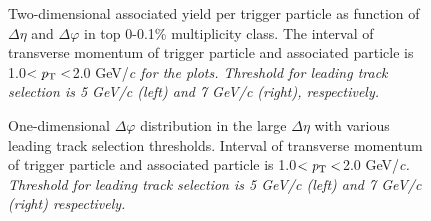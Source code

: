 \documentclass[ALICE,manyauthors]{cernphprep}
\begin{document}
\begin{figure}
	\centering
	\caption{ Two-dimensional associated yield per trigger particle as function of $\Delta\eta$ and $\Delta\varphi$ in top 0-0.1\% multiplicity class. The interval of transverse momentum of trigger particle and associated particle is 1.0$<\it{p}_{\rm{T}}<$2.0 GeV/\it{c}\rm{} for the plots. Threshold for leading track selection is 5 GeV/\it{c}\rm{} (left) and 7 GeV/\it{c}\rm{} (right), respectively. }
\end{figure}


\begin{figure}
	\centering
	\caption{ One-dimensional $\Delta\varphi$ distribution in the large $\Delta\eta$ with various leading track selection thresholds. Interval of transverse momentum of trigger particle and associated particle is 1.0$<\it{p}_{\rm{T}}<$2.0 GeV/\it{c}\rm{}. Threshold for leading track selection is 5 GeV/\it{c}\rm{} (left) and 7 GeV/\it{c}\rm{} (right) respectively. }
\end{figure}
\end{document}

